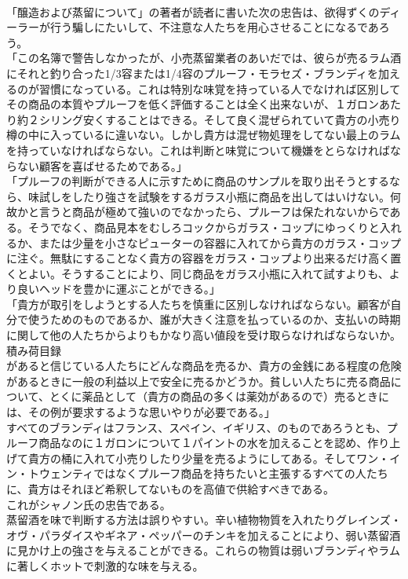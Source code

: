 \documentclass[8pt]{extreport}
\begin{document}
\begin{CJK}{UTF8}{min}
\\	「醸造および蒸留について」の著者が読者に書いた次の忠告は、欲得ずくのディーラーが行う騙しにたいして、不注意な人たちを用心させることになるであろう。
\\	「この名簿で警告しなかったが、小売蒸留業者のあいだでは、彼らが売るラム酒にそれと釣り合った1/3容または1/4容のプルーフ・モラセズ・ブランディを加えるのが習慣になっている。これは特別な味覚を持っている人でなければ区別してその商品の本質やプルーフを低く評価することは全く出来ないが、１ガロンあたり約２シリング安くすることはできる。そして良く混ぜられていて貴方の小売り樽の中に入っているに違いない。しかし貴方は混ぜ物処理をしてない最上のラムを持っていなければならない。これは判断と味覚について機嫌をとらなければならない顧客を喜ばせるためである。」
\\	「プルーフの判断ができる人に示すために商品のサンプルを取り出そうとするなら、味試しをしたり強さを試験をするガラス小瓶に商品を出してはいけない。何故かと言うと商品が極めて強いのでなかったら、プルーフは保たれないからである。そうでなく、商品見本をむしろコックからガラス・コップにゆっくりと入れるか、または少量を小さなピューターの容器に入れてから貴方のガラス・コップに注ぐ。無駄にすることなく貴方の容器をガラス・コップより出来るだけ高く置くとよい。そうすることにより、同じ商品をガラス小瓶に入れて試すよりも、より良いヘッドを豊かに運ぶことができる。」
\\	「貴方が取引をしようとする人たちを慎重に区別しなければならない。顧客が自分で使うためのものであるか、誰が大きく注意を払っているのか、支払いの時期に関して他の人たちからよりもかなり高い値段を受け取らなければならないか。積み荷目録
\\	があると信じている人たちにどんな商品を売るか、貴方の金銭にある程度の危険があるときに一般の利益以上で安全に売るかどうか。貧しい人たちに売る商品について、とくに薬品として（貴方の商品の多くは薬効があるので）売るときには、その例が要求するような思いやりが必要である。」
\\	すべてのブランディはフランス、スペイン、イギリス、のものであろうとも、プルーフ商品なのに１ガロンについて１パイントの水を加えることを認め、作り上げて貴方の桶に入れて小売りしたり少量を売るようにしてある。そしてワン・イン・トウェンティではなくプルーフ商品を持ちたいと主張するすべての人たちに、貴方はそれほど希釈してないものを高値で供給すべきである。
\\	これがシャノン氏の忠告である。
\\	蒸留酒を味で判断する方法は誤りやすい。辛い植物物質を入れたりグレインズ・オヴ・パラダイスやギネア・ペッパーのチンキを加えることにより、弱い蒸留酒に見かけ上の強さを与えることができる。これらの物質は弱いブランディやラムに著しくホットで刺激的な味を与える。

\end{CJK}
\end{document}
